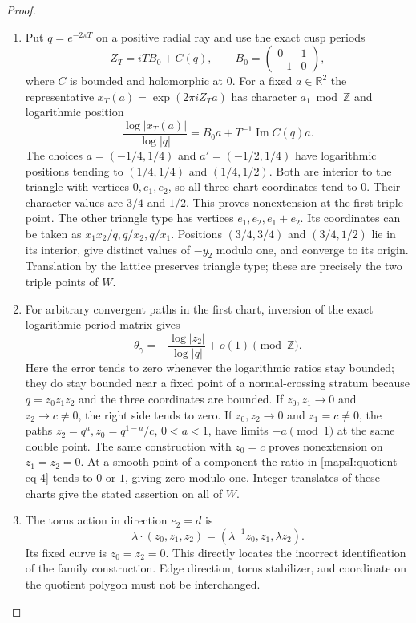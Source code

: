 \begin{proof}
\begin{enumerate}[label=\arabic*.,leftmargin=*]
\item Put $q=e^{-2\pi T}$ on a positive radial ray and use the exact
cusp periods
\[
 Z_T=iTB_0+C(q),\qquad
 B_0=\begin{pmatrix}0&1\\-1&0\end{pmatrix},
\]
where $C$ is bounded and holomorphic at $0$.  For a fixed
$a\in\mathbb R^2$ the representative
$x_T(a)=\exp(2\pi iZ_Ta)$ has character $a_1\bmod\mathbb Z$ and
logarithmic position
\[
 \frac{\log|x_T(a)|}{\log|q|}
 =B_0a+T^{-1}\operatorname{Im}C(q)a.
 \label{mapsI:quotient-eq-3}
\]
The choices $a=(-1/4,1/4)$ and $a'=(-1/2,1/4)$ have logarithmic
positions tending to $(1/4,1/4)$ and $(1/4,1/2)$.
Both are interior to the triangle with vertices $0,e_1,e_2$,
so all three chart coordinates tend to $0$.  Their character
values are $3/4$ and $1/2$.  This proves nonextension at the
first triple point.  The other triangle type has vertices
$e_1,e_2,e_1+e_2$.  Its coordinates can be taken as
$x_1x_2/q,q/x_2,q/x_1$.  Positions $(3/4,3/4)$ and
$(3/4,1/2)$ lie in its interior, give distinct values of $-y_2$
modulo one, and converge to its origin.  Translation by the
lattice preserves triangle type; these are precisely the two
triple points of $W$.

\item For arbitrary convergent paths in the first chart, inversion
of the exact logarithmic period matrix gives
\[
 \theta_\gamma=-\frac{\log|z_2|}{\log|q|}+o(1)\pmod{\mathbb Z}.
 \label{mapsI:quotient-eq-4}
\]
Here the error tends to zero whenever the logarithmic ratios
stay bounded; they do stay bounded near a fixed point of a
normal-crossing stratum because $q=z_0z_1z_2$ and the three
coordinates are bounded.  If $z_0,z_1\to0$ and $z_2\to c\ne0$,
the right side tends to zero.  If $z_0,z_2\to0$ and $z_1=c\ne0$,
the paths $z_2=q^a,z_0=q^{1-a}/c$, $0<a<1$, have limits
$-a\pmod1$ at the same double point.  The same construction
with $z_0=c$ proves nonextension on $z_1=z_2=0$.
At a smooth point of a component the ratio in \eqref{mapsI:quotient-eq-4} tends
to $0$ or $1$, giving zero modulo one.  Integer translates
of these charts give the stated assertion on all of $W$.

\item The torus action in direction $e_2=d$ is
\[
 \lambda\cdot(z_0,z_1,z_2)
       =(\lambda^{-1}z_0,z_1,\lambda z_2).
\]
Its fixed curve is $z_0=z_2=0$.  This directly locates the
incorrect identification of the family construction.  Edge direction,
torus stabilizer, and coordinate on the quotient polygon must
not be interchanged.
\end{enumerate}
\end{proof}

